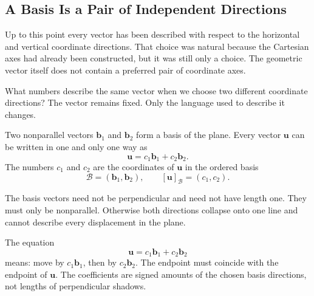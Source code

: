 \subsection{A Basis Is a Pair of Independent Directions}

Up to this point every vector has been described with respect to the horizontal
and vertical coordinate directions. That choice was natural because the
Cartesian axes had already been constructed, but it was still only a choice.
The geometric vector itself does not contain a preferred pair of coordinate
axes.

\begin{corebox}
What numbers describe the same vector when we choose two different coordinate
directions? The vector remains fixed. Only the language used to describe it
changes.
\end{corebox}

\begin{definitionbox}
Two nonparallel vectors $\mathbf b_1$ and $\mathbf b_2$ form a basis of the
plane. Every vector $\mathbf u$ can be written in one and only one way as
\[
\boxed{\mathbf u=c_1\mathbf b_1+c_2\mathbf b_2}.
\]
The numbers $c_1$ and $c_2$ are the coordinates of $\mathbf u$ in the ordered
basis
\[
\mathcal B=(\mathbf b_1,\mathbf b_2),
\qquad
[\mathbf u]_{\mathcal B}=(c_1,c_2).
\]
\end{definitionbox}

The basis vectors need not be perpendicular and need not have length one. They
must only be nonparallel. Otherwise both directions collapse onto one line and
cannot describe every displacement in the plane.

\begin{interpretationbox}
The equation
\[
\mathbf u=c_1\mathbf b_1+c_2\mathbf b_2
\]
means: move by $c_1\mathbf b_1$, then by $c_2\mathbf b_2$. The endpoint must
coincide with the endpoint of $\mathbf u$. The coefficients are signed amounts
of the chosen basis directions, not lengths of perpendicular shadows.
\end{interpretationbox}

